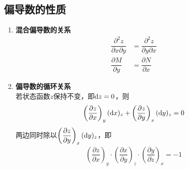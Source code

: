\subsection{偏导数的性质}
\begin{enumerate}
	\item \textbf{混合偏导数的关系}\\
	\begin{align}
		\dfrac{\partial^2 z}{\partial x \partial y} &= \dfrac{\partial^2 z}{\partial y \partial x}\\[0.5em]
		\dfrac{\partial M}{\partial y} &= \dfrac{\partial N}{\partial x}
	\end{align}
	\item \textbf{偏导数的循环关系}\\
	若状态函数$z$保持不变，即${\rm{d}} z = 0$，则
	\begin{align*}
		\left(\dfrac{\partial z}{\partial x}\right)_y ({\rm{d}} x)_z + \left(\dfrac{\partial z}{\partial y}  \right)_x ({\rm{d}} y)_z= 0
	\end{align*}
两边同时除以$\left(\dfrac{\partial z}{\partial y}\right)_x ({\rm{d}} y)_z $，即
\begin{align}
	\left(\dfrac{\partial z}{\partial x}\right)_y \cdot \left(\dfrac{\partial x}{\partial y}\right)_z \cdot \left(\dfrac{\partial y}{\partial z}\right)_x = -1
\end{align}


\end{enumerate}

